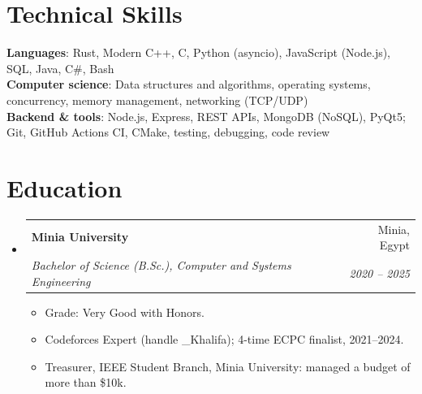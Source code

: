 \documentclass[letterpaper,11pt]{article}
\makeatletter
\newcommand{\resumeItem}[1]{
  \item\small{
    {#1 \vspace{-2pt}}
  }
}
\newcommand{\resumeSubheading}[4]{
  \vspace{-2pt}\item
    \begin{tabular*}{0.97\textwidth}[t]{l@{\extracolsep{\fill}}r}
      \textbf{#1} & #2 \\
      \textit{\small#3} & \textit{\small #4} \\
    \end{tabular*}\vspace{-7pt}
}
\newcommand{\resumeSubHeadingListStart}{\begin{itemize}[leftmargin=0.15in, label={}]}
\newcommand{\resumeSubHeadingListEnd}{\end{itemize}}
\newcommand{\resumeItemListStart}{\begin{itemize}}
\newcommand{\resumeItemListEnd}{\end{itemize}\vspace{-5pt}}
\makeatother
\begin{document}
\section{Technical Skills}
 \begin{itemize}[leftmargin=0.15in, label={}]
    \small{\item{
     \textbf{Languages}{: Rust, Modern C++, C, Python (asyncio), JavaScript (Node.js), SQL, Java, C\#, Bash} \\
     \textbf{Computer science}{: Data structures and algorithms, operating systems, concurrency, memory management, networking (TCP/UDP)} \\
     \textbf{Backend \& tools}{: Node.js, Express, REST APIs, MongoDB (NoSQL), PyQt5; Git, GitHub Actions CI, CMake, testing, debugging, code review}
    }}
 \end{itemize}

\section{Education}
  \resumeSubHeadingListStart
    \resumeSubheading
      {Minia University}{Minia, Egypt}
      {Bachelor of Science (B.Sc.), Computer and Systems Engineering}{2020 -- 2025}
      \resumeItemListStart
        \resumeItem{Grade: Very Good with Honors.}
        \resumeItem{Codeforces Expert (handle \_Khalifa); 4-time ECPC finalist, 2021--2024.}
        \resumeItem{Treasurer, IEEE Student Branch, Minia University: managed a budget of more than \$10k.}
      \resumeItemListEnd
  \resumeSubHeadingListEnd


\end{document}

